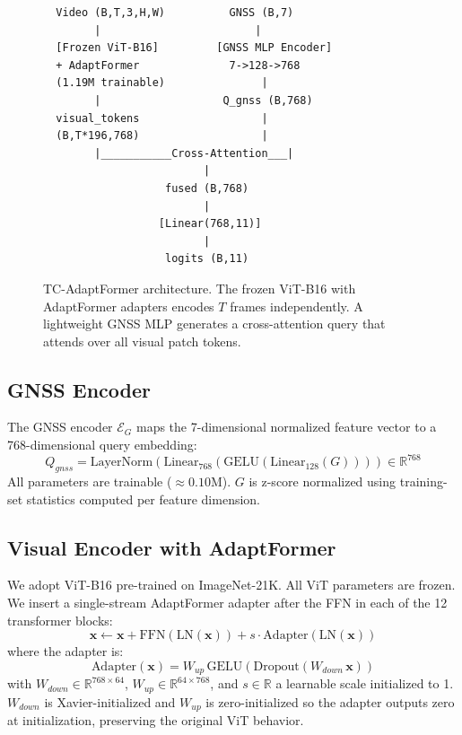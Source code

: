 \documentclass[10pt,twocolumn]{article}
\begin{document}
\begin{figure}[t]
\centering
\begin{verbatim}
  Video (B,T,3,H,W)          GNSS (B,7)
        |                        |
  [Frozen ViT-B16]         [GNSS MLP Encoder]
  + AdaptFormer              7->128->768
  (1.19M trainable)               |
        |                   Q_gnss (B,768)
  visual_tokens                   |
  (B,T*196,768)                   |
        |___________Cross-Attention___|
                         |
                   fused (B,768)
                         |
                  [Linear(768,11)]
                         |
                   logits (B,11)
\end{verbatim}
\caption{TC-AdaptFormer architecture. The frozen ViT-B16 with AdaptFormer adapters encodes $T$ frames independently. A lightweight GNSS MLP generates a cross-attention query that attends over all visual patch tokens.}
\label{fig:arch}
\end{figure}

\subsection{GNSS Encoder}
The GNSS encoder $\mathcal{E}_G$ maps the 7-dimensional normalized feature vector to a 768-dimensional query embedding:
\[
Q_{gnss} = \text{LayerNorm}\!\left(\text{Linear}_{768}\!\left(\text{GELU}\!\left(\text{Linear}_{128}(G)\right)\right)\right) \in \mathbb{R}^{768}
\]
All parameters are trainable ($\approx 0.10$M). $G$ is z-score normalized using training-set statistics computed per feature dimension.

\subsection{Visual Encoder with AdaptFormer}
We adopt ViT-B16 pre-trained on ImageNet-21K. All ViT parameters are frozen. We insert a single-stream AdaptFormer adapter after the FFN in each of the 12 transformer blocks:
\[
\mathbf{x} \leftarrow \mathbf{x} + \text{FFN}(\text{LN}(\mathbf{x})) + s\cdot\text{Adapter}(\text{LN}(\mathbf{x}))
\]
where the adapter is:
\[
\text{Adapter}(\mathbf{x}) = W_{up}\,\text{GELU}\!\left(\text{Dropout}(W_{down}\,\mathbf{x})\right)
\]
with $W_{down} \in \mathbb{R}^{768 \times 64}$, $W_{up} \in \mathbb{R}^{64 \times 768}$, and $s \in \mathbb{R}$ a learnable scale initialized to 1. $W_{down}$ is Xavier-initialized and $W_{up}$ is zero-initialized so the adapter outputs zero at initialization, preserving the original ViT behavior.
\end{document}
